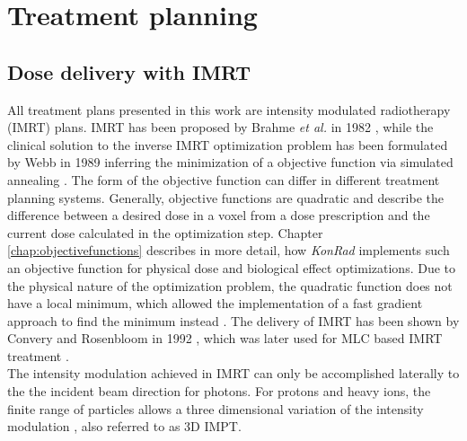 \section{Treatment planning}
\subsection{Dose delivery with IMRT}
All treatment plans presented in this work are intensity modulated radiotherapy (IMRT) plans. IMRT has been proposed by Brahme \textit{et al.} in 1982 \cite{pmid7146095}, while the clinical solution to the inverse IMRT optimization problem has been formulated by Webb in 1989 \cite{pmid2682694} inferring the minimization of a objective function via simulated annealing \cite{pmid16790913}. The form of the objective function can differ in different treatment planning systems. Generally, objective functions are quadratic and describe the difference between a desired dose in a voxel from a dose prescription and the current dose calculated in the optimization step. Chapter \ref{chap:objectivefunctions} describes in more detail, how \textit{KonRad} implements such an objective function for physical dose and biological effect optimizations. Due to the physical nature of the optimization problem, the quadratic function does not have a local minimum, which allowed the implementation of a fast gradient approach to find the minimum instead \cite{pmid2243845}. The delivery of IMRT has been shown by Convery and Rosenbloom in 1992 \cite{Convery_Rosebloom_1992}, which was later used for MLC based IMRT treatment \cite{pmid8690638}. \\The intensity modulation achieved in IMRT can only be accomplished laterally to the the incident beam direction for photons. For protons and heavy ions, the finite range of particles allows a three dimensional variation of the intensity modulation \cite{pmid10071883}, also referred to as 3D IMPT.
